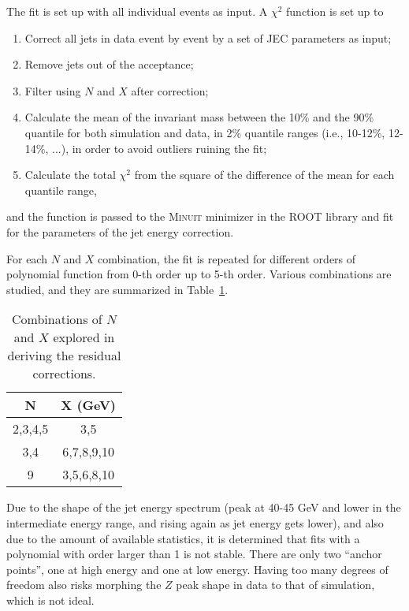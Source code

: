 The fit is set up with all individual events as input.  A $\chi^2$ function is set up to
%
\begin{enumerate}
    \item Correct all jets in data event by event by a set of JEC parameters as input;
    \item Remove jets out of the acceptance;
    \item Filter using $N$ and $X$ after correction;
    \item Calculate the mean of the invariant mass between the 10\% and the 90\% quantile for both simulation and data, in 2\% quantile ranges (i.e., 10-12\%, 12-14\%, ...), in order to avoid outliers ruining the fit;
    \item Calculate the total $\chi^2$ from the square of the difference of the mean for each quantile range,
\end{enumerate}
%
and the function is passed to the \textsc{Minuit} minimizer in the \textsc{ROOT} library and fit for the parameters of the jet energy correction.

For each $N$ and $X$ combination, the fit is repeated for different orders of polynomial function from 0-th order up to 5-th order.  Various combinations are studied, and they are summarized in Table~\ref{Table:JetCalibration-AbsoluteResidualNXCombination}.

\begin{table}[htp!]
    \centering
    \begin{tabular}{|c|c|}
        \hline
        N & X (GeV) \\\hline
        2,3,4,5 & 3,5 \\\hline
        3,4 & 6,7,8,9,10 \\\hline
        9 & 3,5,6,8,10 \\\hline
    \end{tabular}
    \caption{Combinations of $N$ and $X$ explored in deriving the residual corrections.}
    \label{Table:JetCalibration-AbsoluteResidualNXCombination}
\end{table}

Due to the shape of the jet energy spectrum (peak at 40-45 GeV and lower in the intermediate energy range, and rising again as jet energy gets lower), and also due to the amount of available statistics, it is determined that fits with a polynomial with order larger than 1 is not stable.  There are only two ``anchor points'', one at high energy and one at low energy.  Having too many degrees of freedom also risks morphing the $Z$ peak shape in data to that of simulation, which is not ideal.

